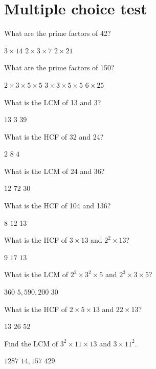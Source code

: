 \documentclass{article}
\begin{document}
\section*{Multiple choice test}

\begin{questions}
\question
What are the prime factors of 42?
\begin{choices}
\choice $3\times 14$
\correctchoice $2\times 3\times 7$
\choice $2\times 21$
\end{choices}

\question
What are the prime factors of 150?
\begin{choices}
\correctchoice $2\times 3\times 5\times 5$
\choice $3\times 3\times 5\times 5$
\choice $6\times 25$
\end{choices}

\question
What is the LCM of 13 and 3?
\begin{choices}
\choice $13$
\choice $3$
\correctchoice $39$
\end{choices}

\question
What is the HCF of 32 and 24?
\begin{choices}
\choice $2$
\correctchoice $8$
\choice $4$
\end{choices}

\question
What is the LCM of 24 and 36?
\begin{choices}
\choice $12$
\correctchoice $72$
\choice $30$
\end{choices}

\question
What is the HCF of 104 and 136?
\begin{choices}
\correctchoice $8$
\choice $12$
\choice $13$
\end{choices}

\question
What is the HCF of $3\times 13$ and $2^2\times 13$?
\begin{choices}
\choice $9$
\choice $17$
\correctchoice $13$
\end{choices}

\question
What is the LCM of $2^2\times 3^2\times 5$ and $2^3\times 3\times 5$?
\begin{choices}
\correctchoice $360$
\choice $5,590,200$
\choice $30$
\end{choices}

\question
What is the HCF of $2\times 5\times 13$ and $22\times 13$?
\begin{choices}
\choice $13$
\correctchoice $26$
\choice $52$
\end{choices}

\question
Find the LCM of $3^2\times 11\times 13$ and $3\times 11^2$.
\begin{choices}
\choice $1287$
\correctchoice $14,157$
\choice $429$
\end{choices}

\end{questions}
\end{document}

